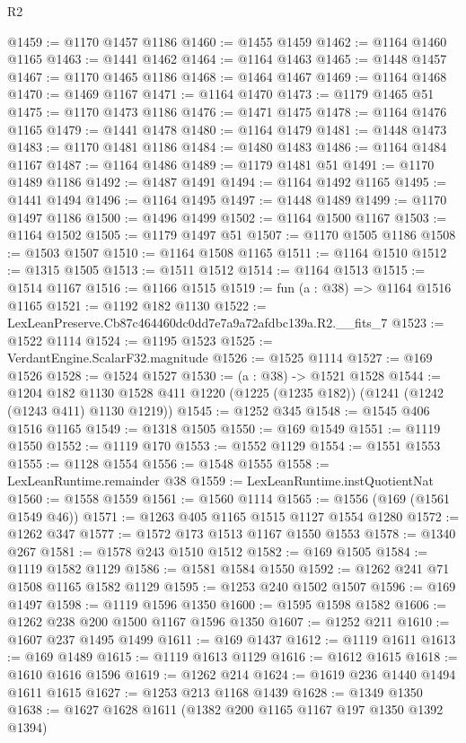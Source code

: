 \begin{lexlean}{R2}
\begin{coremodule}
@1459 := @1170 @1457 @1186
@1460 := @1455 @1459
@1462 := @1164 @1460 @1165
@1463 := @1441 @1462
@1464 := @1164 @1463
@1465 := @1448 @1457
@1467 := @1170 @1465 @1186
@1468 := @1464 @1467
@1469 := @1164 @1468
@1470 := @1469 @1167
@1471 := @1164 @1470
@1473 := @1179 @1465 @51
@1475 := @1170 @1473 @1186
@1476 := @1471 @1475
@1478 := @1164 @1476 @1165
@1479 := @1441 @1478
@1480 := @1164 @1479
@1481 := @1448 @1473
@1483 := @1170 @1481 @1186
@1484 := @1480 @1483
@1486 := @1164 @1484 @1167
@1487 := @1164 @1486
@1489 := @1179 @1481 @51
@1491 := @1170 @1489 @1186
@1492 := @1487 @1491
@1494 := @1164 @1492 @1165
@1495 := @1441 @1494
@1496 := @1164 @1495
@1497 := @1448 @1489
@1499 := @1170 @1497 @1186
@1500 := @1496 @1499
@1502 := @1164 @1500 @1167
@1503 := @1164 @1502
@1505 := @1179 @1497 @51
@1507 := @1170 @1505 @1186
@1508 := @1503 @1507
@1510 := @1164 @1508 @1165
@1511 := @1164 @1510
@1512 := @1315 @1505
@1513 := @1511 @1512
@1514 := @1164 @1513
@1515 := @1514 @1167
@1516 := @1166 @1515
@1519 := fun (a : @38) => @1164 @1516 @1165
@1521 := @1192 @182 @1130
@1522 := LexLeanPreserve.Cb87c464460dc0dd7e7a9a72afdbc139a.R2.__fits_7
@1523 := @1522 @1114
@1524 := @1195 @1523
@1525 := VerdantEngine.ScalarF32.magnitude
@1526 := @1525 @1114
@1527 := @169 @1526
@1528 := @1524 @1527
@1530 := (a : @38) -> @1521 @1528
@1544 := @1204
    @182
    @1130
    @1528
    @411
    @1220
    (@1225 (@1235 @182))
    (@1241 (@1242 (@1243 @411) @1130 @1219))
@1545 := @1252 @345
@1548 := @1545 @406 @1516 @1165
@1549 := @1318 @1505
@1550 := @169 @1549
@1551 := @1119 @1550
@1552 := @1119 @170
@1553 := @1552 @1129
@1554 := @1551 @1553
@1555 := @1128 @1554
@1556 := @1548 @1555
@1558 := LexLeanRuntime.remainder @38
@1559 := LexLeanRuntime.instQuotientNat
@1560 := @1558 @1559
@1561 := @1560 @1114
@1565 := @1556 (@169 (@1561 @1549 @46))
@1571 := @1263 @405 @1165 @1515 @1127 @1554 @1280
@1572 := @1262 @347
@1577 := @1572 @173 @1513 @1167 @1550 @1553
@1578 := @1340 @267
@1581 := @1578 @243 @1510 @1512
@1582 := @169 @1505
@1584 := @1119 @1582 @1129
@1586 := @1581 @1584 @1550
@1592 := @1262 @241 @71 @1508 @1165 @1582 @1129
@1595 := @1253 @240 @1502 @1507
@1596 := @169 @1497
@1598 := @1119 @1596 @1350
@1600 := @1595 @1598 @1582
@1606 := @1262 @238 @200 @1500 @1167 @1596 @1350
@1607 := @1252 @211
@1610 := @1607 @237 @1495 @1499
@1611 := @169 @1437
@1612 := @1119 @1611
@1613 := @169 @1489
@1615 := @1119 @1613 @1129
@1616 := @1612 @1615
@1618 := @1610 @1616 @1596
@1619 := @1262 @214
@1624 := @1619 @236 @1440 @1494 @1611 @1615
@1627 := @1253 @213 @1168 @1439
@1628 := @1349 @1350
@1638 := @1627 @1628 @1611 (@1382 @200 @1165 @1167 @197 @1350 @1392 @1394)

\end{coremodule}
\end{lexlean}
